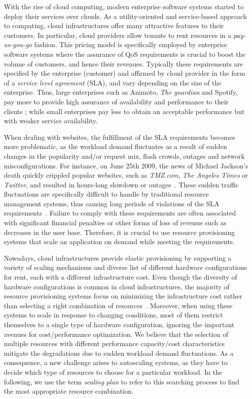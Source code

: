 With the rise of cloud computing, modern enterprise software systems
started to deploy their services over clouds. As a utility-oriented
and service-based approach to computing, cloud infrastructures offer
many attractive features to their customers.  In particular, cloud
providers allow tenants to rent resources in a \emph{pay-as-you-go}
fashion. This pricing model is specifically employed by enterprise
software systems where the assurance of QoS requirements is crucial to
boost the volume of customers, and hence their revenues. Typically
these requirements are specified by the enterprise (customer) and
affirmed by cloud provider in the form of a \emph{service level
agreement} (SLA), and vary depending on the size of the
enterprise. Thus, large enterprises such as Animoto, \emph{The
guardian} and Spotify, pay more to provide high assurance of
availability and performance to their clients \cite{casestudiescloud};
while small enterprises pay less to obtain an acceptable performance
but with weaker service availability.


When dealing with websites, the fulfillment of the SLA requirements
becomes more problematic, as the workload demand fluctuates as a
result of sudden changes in the popularity and/or request mix, flash
crowds, outages and network misconfigurations.  For instance, on June
25th 2009, the news of Michael Jackson's death quickly crippled
popular websites, such as \emph{TMZ.com}, \emph{The Angeles Times}
or \emph{Twitter}, and resulted in hours-long slowdown or
outages~\cite{outagesTimes}. These sudden traffic fluctuations are
specifically difficult to handle by traditional resource management
systems, thus causing long periods of violations of the SLA
requirements~\cite{trafficCongestion}. Failure to comply with these
requirements are often associated with significant financial penalties
or other forms of loss of revenue such as decreases in the user base.
Therefore, it is crucial to use resource provisioning systems that
scale an application on demand while meeting the requirements.

Nowadays, cloud infrastructures provide elastic provisioning by
supporting a variety of scaling mechanisms and diverse list of
different hardware configurations for rent, each with a different
infrastructure cost. Even though the diversity of hardware
configurations is common in cloud infrastructures, the majority of
resource provisioning systems focus on minimizing the infrastructure
cost rather than selecting a right combination of
resources~\cite{herbst_2013,urgaonkar_agile_2008,dejavu2012}. Moreover,
when using these systems to scale in response to changing conditions,
most of them restrict themselves to a single type of hardware
configuration, ignoring the important avenues for cost/performance
optimization. We believe that the selection of multiple resources with
different performance capacity/cost characteristics mitigate the
degradations due to sudden workload demand fluctuations. As a
consequence, a new challenge arises to autoscaling systems, as they
have to decide which type of resources to choose for a particular
workload. In the following, we use the term \emph{scaling plan} to
refer to this searching process to find the most appropriate resource
combination.

